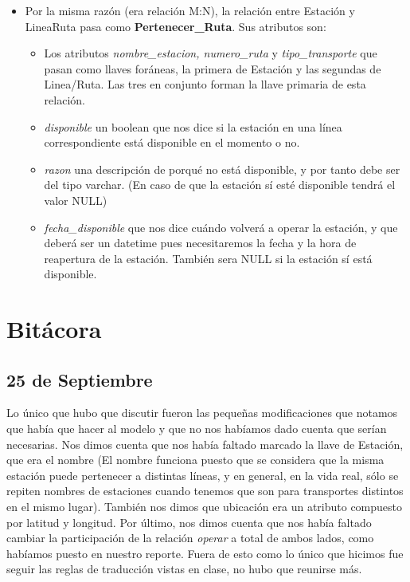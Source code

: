 \documentclass[11pt]{article}
\begin{document}
\begin{itemize}
\item Por la misma razón (era relación M:N), la relación entre Estación y LineaRuta pasa como \textbf{Pertenecer\_Ruta}. Sus atributos son:
    \begin{itemize}
        \item Los atributos \textit{nombre\_estacion, numero\_ruta} y \textit{tipo\_transporte} que pasan como llaves foráneas, la primera de Estación y las segundas de Linea/Ruta. Las tres en conjunto forman la llave primaria de esta relación.
        \item \textit{disponible} un boolean que nos dice si la estación en una línea correspondiente está disponible en el momento o no.
        \item \textit{razon} una descripción de porqué no está disponible, y por tanto debe ser del tipo varchar. (En caso de que la estación sí esté disponible tendrá el valor NULL)
        \item \textit{fecha\_disponible} que nos dice cuándo volverá a operar la estación, y que deberá ser un datetime pues necesitaremos la fecha y la hora de reapertura de la estación. También sera NULL si la estación sí está disponible.
    \end{itemize}
\end{itemize}
\pagebreak
\section*{Bitácora}

\subsection*{25 de Septiembre}

Lo único que hubo que discutir fueron las pequeñas modificaciones que notamos que había que hacer al modelo y que no nos habíamos dado cuenta que serían necesarias. Nos dimos cuenta que nos había faltado marcado la llave de Estación, que era el nombre (El nombre funciona puesto que se considera que la misma estación puede pertenecer a distintas líneas, y en general, en la vida real, sólo se repiten nombres de estaciones cuando tenemos que son para transportes distintos en el mismo lugar). También nos dimos que ubicación era un atributo compuesto por latitud y longitud. Por último, nos dimos cuenta que nos había faltado cambiar la participación de la relación \textit{operar} a total de ambos lados, como habíamos puesto en nuestro reporte. Fuera de esto como lo único que hicimos fue seguir las reglas de traducción vistas en clase, no hubo que reunirse más. 
\end{document}
